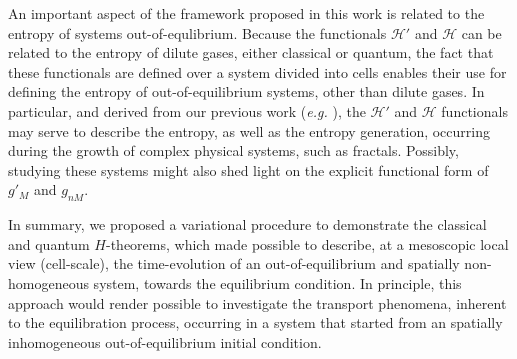 An important aspect of the framework proposed in this work is related to the entropy of systems
out-of-equlibrium. Because the functionals $\mathcal{H}'$ and $\mathcal{H}$ can be related to
the entropy of dilute gases, either classical or quantum, the fact that these functionals are defined
over a system divided into cells enables their use for defining the entropy
of out-of-equilibrium systems, other than dilute gases. In particular, and 
derived from our previous work (\textit{e.g.} \cite{bib:nicolas2020,bib:nicolas2016}), the
$\mathcal H'$ and $\mathcal H$ functionals may serve to describe the entropy,
as well as the entropy generation, occurring during the
growth of complex physical systems, such as fractals. Possibly, studying these systems might also
shed light on the explicit functional form of $g'_M$ and $g_{nM}$.

In summary, we proposed a variational procedure to demonstrate the classical and
quantum $H$-theorems, which made possible to describe, at a mesoscopic local view
(cell-scale), the time-evolution of an out-of-equilibrium and spatially
non-homogeneous system, towards the equilibrium condition. In principle, this
approach would render possible to investigate the transport phenomena, inherent to the
equilibration process, occurring in a system that started from an spatially inhomogeneous
out-of-equilibrium initial condition. 


